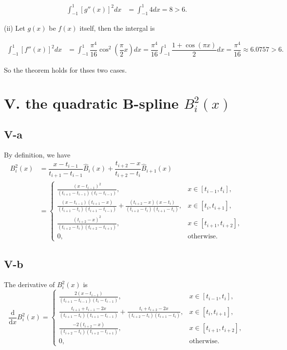 \documentclass[a4paper]{article}
\begin{document}
\begin{align*}
  \int_{-1}^{1} [g''(x)]^2dx &= \int_{-1}^{1} 4dx = 8 > 6  .
\end{align*}

(ii) Let $g(x)$ be $f(x)$ itself, then the intergal is 

\begin{align*}
  \int_{-1}^{1} [f''(x)]^2dx &= \int_{-1}^{1} \dfrac{\pi^4}{16} \cos^2(\dfrac{\pi}{2}x)dx = \dfrac{\pi^4}{16} \int_{-1}^{1} \dfrac{1+\cos(\pi x)}{2}dx = \dfrac{\pi^4}{16} \approx 6.0757 > 6.
\end{align*}

So the theorem holds for thses two cases.

\section*{V. the quadratic B-spline $B_i^2(x)$}
\subsection*{V-a}
By definition, we have
\begin{align*}
  B_i^2(x) &= \dfrac{x-t_{i-1}}{t_{i+1} - t_{i-1}}\hat{B}_i(x) + \dfrac{t_{i+2} - x}{t_{i+2} - t_i}\hat{B}_{i+1}(x)\\
  &= \begin{cases}
    \frac{(x-t_{i-1})^2}{(t_{i+1} - t_{i-1})(t_i - t_{i-1})}, & x \in [t_{i-1}, t_i], \\
    \frac{(x-t_{i-1})(t_{i+1} - x)}{(t_{i+1}- t_i)(t_{i+1}-t_{i-1})} + \frac{(t_{i+2} - x)(x-t_i)}{(t_{i+2}-t_i)(t_{i+1} - t_i)}, & x \in [t_i, t_{i+1}], \\
    \frac{(t_{i+2}-x)^2}{(t_{i+2}-t_{i})(t_{i+2}-t_{i+1})}, & x \in [t_{i+1}, t_{i+2}], \\
    0, & \text{otherwise}.
  \end{cases}
\end{align*}

\subsection*{V-b}
The derivative of $B_i^2(x)$ is
\[
  \frac{\text{d}}{\text{d}x}B_i^2(x)= \begin{cases}
    \frac{2(x-t_{i-1})}{(t_{i+1} - t_{i-1})(t_i - t_{i-1})}, & x \in [t_{i-1}, t_i], \\
    \frac{t_{i+1} + t_{i-1} -2x}{(t_{i+1}- t_i)(t_{i+1}-t_{i-1})} + \frac{t_{i} + t_{i+2}  -2 x}{(t_{i+2}-t_i)(t_{i+1} - t_i)}, & x \in [t_i, t_{i+1}], \\
    \frac{-2(t_{i+2}-x)}{(t_{i+2}-t_{i})(t_{i+2}-t_{i+1})}, & x \in [t_{i+1}, t_{i+2}], \\
    0, & \text{otherwise}.
  \end{cases}
\]
\end{document}
